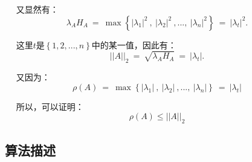 \documentclass[cs4size,a4paper]{ctexart}
\numberwithin{equation}{section}
\numberwithin{table}{section}
\numberwithin{figure}{section}
\begin{document}
~   ~又显然有：
\begin{displaymath}
\lambda_AH_A ~=~ \max\left\{\left|\lambda_1\right|^2 ~,~ \left|\lambda_2\right|^2 ~,...,~ \left|\lambda_n\right|^2\right\} ~=~ \left|\lambda_t\right|^2.
\end{displaymath}

~  ~这里$ t $是$ \left\{1, 2, ...,n\right\} $中的某一值，因此有：
\begin{displaymath}
\left|\left|A\right|\right|_2 ~=~ \sqrt{\lambda_AH_A} ~=~ \left|\lambda_t\right|.
\end{displaymath}

~  ~又因为：
\begin{displaymath}
\rho\left(A\right)~=~\max\left\{\left|\lambda_1\right| ~,~ \left|\lambda_2\right| ~,...,~ \left|\lambda_n\right|\right\} ~=~ \left|\lambda_t\right|
\end{displaymath}

~  ~所以，可以证明：
\begin{displaymath}
\rho\left(A\right)\leq\left|\left|A\right|\right|_2
\end{displaymath}

\subsection{算法描述}
\end{document}

